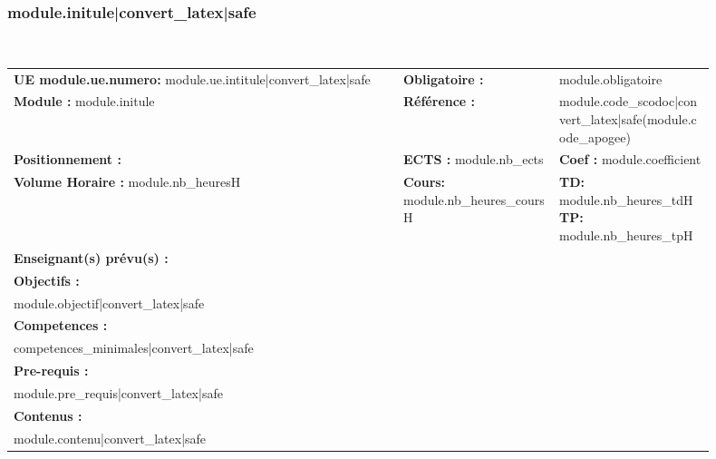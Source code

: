 {%
{%

\subsubsection*{ {{module.initule|convert_latex|safe}}}~\\
\begin{tabular}{|p{0.5\linewidth}p{0.2\linewidth}p{0.2\linewidth}|}
\hline
\textbf{UE {{module.ue.numero}}:} {{module.ue.intitule|convert_latex|safe}}
&\textbf{Obligatoire :} & {{module.obligatoire}} \\
\textbf{Module :} {{module.initule}}
&\textbf{Référence :} &  {{module.code_scodoc|convert_latex|safe}}({{module.code_apogee}}) \\
\textbf{Positionnement :} 
&\textbf{ECTS :} {{module.nb_ects}}&\textbf{Coef :} {{module.coefficient}}\\
\textbf{Volume Horaire :} {{module.nb_heures}}H
&\textbf{Cours:} {{module.nb_heures_cours}}H& \textbf{TD:} {{module.nb_heures_td}}H  \textbf{TP:} {{module.nb_heures_tp}}H \\
\multicolumn{3}{|l|}{\begin{minipage}[b]{1\linewidth}\textbf{Enseignant(s) prévu(s) :}

\end{minipage}}\\
\hline\multicolumn{3}{|l|}{\textbf{Objectifs :} }\\
\multicolumn{3}{|l|}{
\parbox{0.9\textwidth}{

{{module.objectif|convert_latex|safe}}

} }\\
\hline
\multicolumn{3}{|l|}{\textbf{Competences :} }\\
\multicolumn{3}{|l|}{
\parbox{0.9\textwidth}{

{{competences_minimales|convert_latex|safe}}

} }\\
\hline
\multicolumn{3}{|l|}{\textbf{Pre-requis :} }\\
\multicolumn{3}{|l|}{
\parbox{0.9\textwidth}{

{{module.pre_requis|convert_latex|safe}}

} }\\
\hline
\multicolumn{3}{|l|}{\textbf{Contenus :} }\\
\multicolumn{3}{|l|}{
\parbox{0.9\textwidth}{

{{module.contenu|convert_latex|safe}}

}}
\end{tabular}}}
